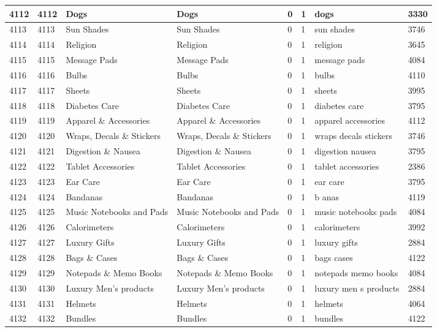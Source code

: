 \begin{longtable}{|l|l|l|l|l|l|l|l|}
4112 & 4112 & Dogs & Dogs & 0 & 1 & dogs & 3330 \\ \hline 
4113 & 4113 & Sun Shades & Sun Shades & 0 & 1 & sun shades & 3746 \\ \hline 
4114 & 4114 & Religion & Religion & 0 & 1 & religion & 3645 \\ \hline 
4115 & 4115 & Message Pads & Message Pads & 0 & 1 & message pads & 4084 \\ \hline 
4116 & 4116 & Bulbs & Bulbs & 0 & 1 & bulbs & 4110 \\ \hline 
4117 & 4117 & Sheets & Sheets & 0 & 1 & sheets & 3995 \\ \hline 
4118 & 4118 & Diabetes Care & Diabetes Care & 0 & 1 & diabetes care & 3795 \\ \hline 
4119 & 4119 & Apparel \& Accessories & Apparel \& Accessories & 0 & 1 & apparel accessories & 4112 \\ \hline 
4120 & 4120 & Wraps, Decals \& Stickers & Wraps, Decals \& Stickers & 0 & 1 & wraps decals stickers & 3746 \\ \hline 
4121 & 4121 & Digestion \& Nausea & Digestion \& Nausea & 0 & 1 & digestion nausea & 3795 \\ \hline 
4122 & 4122 & Tablet Accessories & Tablet Accessories & 0 & 1 & tablet accessories & 2386 \\ \hline 
4123 & 4123 & Ear Care & Ear Care & 0 & 1 & ear care & 3795 \\ \hline 
4124 & 4124 & Bandanas & Bandanas & 0 & 1 & b anas & 4119 \\ \hline 
4125 & 4125 & Music Notebooks and Pads & Music Notebooks and Pads & 0 & 1 & music notebooks pads & 4084 \\ \hline 
4126 & 4126 & Calorimeters & Calorimeters & 0 & 1 & calorimeters & 3992 \\ \hline 
4127 & 4127 & Luxury Gifts & Luxury Gifts & 0 & 1 & luxury gifts & 2884 \\ \hline 
4128 & 4128 & Bags \& Cases & Bags \& Cases & 0 & 1 & bags cases & 4122 \\ \hline 
4129 & 4129 & Notepads \& Memo Books & Notepads \& Memo Books & 0 & 1 & notepads memo books & 4084 \\ \hline 
4130 & 4130 & Luxury Men's products & Luxury Men's products & 0 & 1 & luxury men s products & 2884 \\ \hline 
4131 & 4131 & Helmets & Helmets & 0 & 1 & helmets & 4064 \\ \hline 
4132 & 4132 & Bundles & Bundles & 0 & 1 & bundles & 4122 \\ \hline 

\end{longtable}
